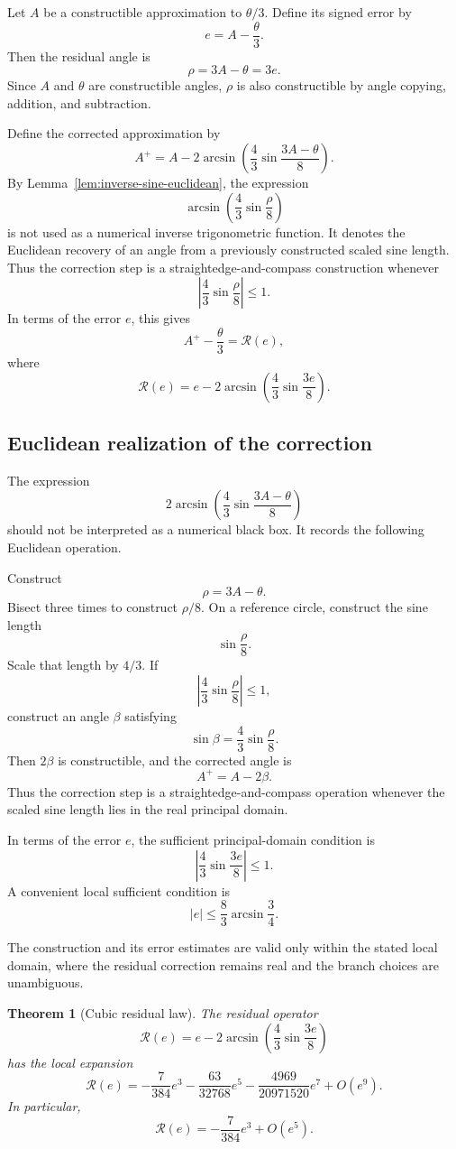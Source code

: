 \documentclass[11pt]{article}
\newtheorem{theorem}{Theorem}
\theoremstyle{remark}
\newcommand{\Rop}{\mathscr{R}}
\begin{document}
Let $A$ be a constructible approximation to $\theta/3$. Define its signed error by
\[
e=A-\frac{\theta}{3}.
\]
Then the residual angle is
\[
\rho=3A-\theta=3e.
\]
Since $A$ and $\theta$ are constructible angles, $\rho$ is also constructible by angle copying, addition, and subtraction.

Define the corrected approximation by
\[
A^+
=
A
-
2\arcsin\!\left(
\frac43\sin\frac{3A-\theta}{8}
\right).
\]
By Lemma~\ref{lem:inverse-sine-euclidean}, the expression
\[
\arcsin\!\left(
\frac43\sin\frac{\rho}{8}
\right)
\]
is not used as a numerical inverse trigonometric function.  It denotes the
Euclidean recovery of an angle from a previously constructed scaled sine length.
Thus the correction step is a straightedge-and-compass construction whenever
\[
\left|
\frac43\sin\frac{\rho}{8}
\right|
\le 1.
\]
In terms of the error $e$, this gives
\[
A^+-\frac{\theta}{3}
=
\Rop(e),
\]
where
\[
\Rop(e)
=
e
-
2\arcsin\!\left(
\frac43\sin\frac{3e}{8}
\right).
\]

\subsection{Euclidean realization of the correction}

The expression
\[
2\arcsin\!\left(
\frac43\sin\frac{3A-\theta}{8}
\right)
\]
should not be interpreted as a numerical black box.  It records the following Euclidean
operation.

Construct
\[
\rho=3A-\theta.
\]
Bisect three times to construct $\rho/8$.  On a reference circle, construct the sine length
\[
\sin\frac{\rho}{8}.
\]
Scale that length by $4/3$.  If
\[
\left|\frac43\sin\frac{\rho}{8}\right|
\le 1,
\]
construct an angle $\beta$ satisfying
\[
\sin\beta
=
\frac43\sin\frac{\rho}{8}.
\]
Then $2\beta$ is constructible, and the corrected angle is
\[
A^+=A-2\beta.
\]
Thus the correction step is a straightedge-and-compass operation whenever the scaled sine
length lies in the real principal domain.

In terms of the error $e$, the sufficient principal-domain condition is
\[
\left|\frac43\sin\frac{3e}{8}\right|
\le 1.
\]
A convenient local sufficient condition is
\[
|e|
\le
\frac83\arcsin\frac34.
\]

The construction and its error estimates are valid only within the stated local domain, where the residual correction remains real and the branch choices are unambiguous.

\begin{theorem}[Cubic residual law]\label{thm:residual}
The residual operator
\[
\Rop(e)
=
e
-
2\arcsin\!\left(
\frac43\sin\frac{3e}{8}
\right)
\]
has the local expansion
\[
\Rop(e)
=
-\frac{7}{384}e^3
-
\frac{63}{32768}e^5
-
\frac{4969}{20971520}e^7
+
O(e^9).
\]
In particular,
\[
\Rop(e)
=
-\frac{7}{384}e^3+O(e^5).
\]
\end{theorem}
\end{document}
